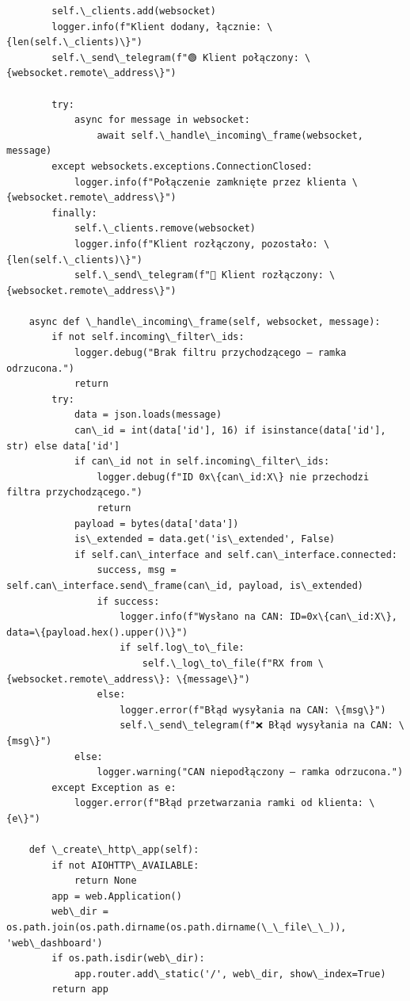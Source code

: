 \begin{lstlisting}
        self.\_clients.add(websocket)
        logger.info(f"Klient dodany, łącznie: \{len(self.\_clients)\}")
        self.\_send\_telegram(f"🟢 Klient połączony: \{websocket.remote\_address\}")

        try:
            async for message in websocket:
                await self.\_handle\_incoming\_frame(websocket, message)
        except websockets.exceptions.ConnectionClosed:
            logger.info(f"Połączenie zamknięte przez klienta \{websocket.remote\_address\}")
        finally:
            self.\_clients.remove(websocket)
            logger.info(f"Klient rozłączony, pozostało: \{len(self.\_clients)\}")
            self.\_send\_telegram(f"🔴 Klient rozłączony: \{websocket.remote\_address\}")

    async def \_handle\_incoming\_frame(self, websocket, message):
        if not self.incoming\_filter\_ids:
            logger.debug("Brak filtru przychodzącego – ramka odrzucona.")
            return
        try:
            data = json.loads(message)
            can\_id = int(data['id'], 16) if isinstance(data['id'], str) else data['id']
            if can\_id not in self.incoming\_filter\_ids:
                logger.debug(f"ID 0x\{can\_id:X\} nie przechodzi filtra przychodzącego.")
                return
            payload = bytes(data['data'])
            is\_extended = data.get('is\_extended', False)
            if self.can\_interface and self.can\_interface.connected:
                success, msg = self.can\_interface.send\_frame(can\_id, payload, is\_extended)
                if success:
                    logger.info(f"Wysłano na CAN: ID=0x\{can\_id:X\}, data=\{payload.hex().upper()\}")
                    if self.log\_to\_file:
                        self.\_log\_to\_file(f"RX from \{websocket.remote\_address\}: \{message\}")
                else:
                    logger.error(f"Błąd wysyłania na CAN: \{msg\}")
                    self.\_send\_telegram(f"❌ Błąd wysyłania na CAN: \{msg\}")
            else:
                logger.warning("CAN niepodłączony – ramka odrzucona.")
        except Exception as e:
            logger.error(f"Błąd przetwarzania ramki od klienta: \{e\}")

    def \_create\_http\_app(self):
        if not AIOHTTP\_AVAILABLE:
            return None
        app = web.Application()
        web\_dir = os.path.join(os.path.dirname(os.path.dirname(\_\_file\_\_)), 'web\_dashboard')
        if os.path.isdir(web\_dir):
            app.router.add\_static('/', web\_dir, show\_index=True)
        return app


\end{lstlisting}
